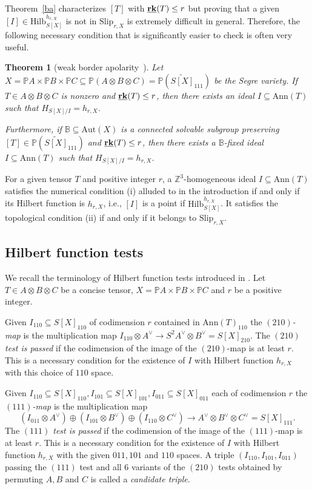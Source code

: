 \documentclass[12pt]{amsart}
\newtheorem{theorem}{Theorem}[section]
\theoremstyle{definition}
\theoremstyle{remark}
\theoremstyle{definition}
\newcommand{\brk}{{\underline{{\bf rk}}}}
\newcommand{\Slip}[2]{\mathrm{Slip}_{#1,#2}}
\newcommand{\PP}{\mathbb{P}}
\newcommand{\Ann}{\mathrm{Ann}}
\newcommand{\Hilb}{\mathrm{Hilb}}
\begin{document}
Theorem~\ref{ba} characterizes $[T]$ with $\brk(T) \le r$ but proving that a given $[I]\in \Hilb_{S[X]}^{h_{r,X}}$ is not in $\Slip{r}{X}$ is extremely difficult in general. Therefore, the following necessary condition that is significantly easier to check is often very useful.

\begin{theorem}[weak border apolarity~{\cite[Theorems~1.2]{BB19}}]\label{wba}
 Let $X = \PP A\times \PP B \times \PP C \subseteq \PP (A\otimes B\otimes C) = \PP (\widetilde{S[X]}_{111})$ be the Segre variety. If $T\in A\otimes B\otimes C$ is nonzero and $\brk(T) \le r$, then there exists an ideal $I\subseteq \Ann(T)$ such that $H_{S[X]/I}=h_{r,X}$. 

  Furthermore, if $\mathbb{B}\subseteq \mathrm{Aut}(X)$ is a connected solvable subgroup preserving $[T] \in \PP(\widetilde{S[X]}_{111})$ and $\brk(T) \le r$, then there exists a $\mathbb{B}$-fixed ideal $I\subseteq \Ann(T)$ such that $H_{S[X]/I}=h_{r,X}$.
\end{theorem}


For a given tensor $T$ and positive integer $r$, a $\mathbb{Z}^3$-homogeneous ideal $I\subseteq\Ann(T)$ satisfies the numerical condition (i) alluded to in the introduction if and only if its Hilbert function is $h_{r,X}$, i.e., $[I]$ is a point if $\Hilb_{S[X]}^{h_{r,X}}$. It satisfies the topological condition (ii) if and only if it belongs to $\mathrm{Slip}_{r,X}$.



\subsection{Hilbert function tests}\label{sub:HFtests}
We recall the terminology of Hilbert function tests introduced in \cite{chl19}. Let $T\in A\otimes B\otimes C$ be a concise tensor, $X=\PP A\times \PP B\times \PP C$ and $r$ be a positive integer.

Given $I_{110}\subseteq S[X]_{110}$ of codimension $r$ contained in $\Ann(T)_{110}$ the \emph{$(210)$-map} is the multiplication map
$I_{110}\otimes A^\vee \to S^2A^\vee\otimes B^\vee = S[X]_{210}$. The \emph{$(210)$ test is passed} if the codimension of the image of the $(210)$-map is at least $r$.
This is a necessary condition for the existence of $I$ with Hilbert function $h_{r,X}$ with this choice of $110$ space.

Given $I_{110}\subseteq S[X]_{110}, I_{101}\subseteq S[X]_{101}, I_{011}\subseteq S[X]_{011}$ each of codimension $r$ the \emph{$(111)$-map} is the multiplication map
\[
(I_{011}\otimes A^\vee) \oplus (I_{101}\otimes B^\vee) \oplus (I_{110}\otimes C^\vee) \to A^\vee\otimes B^\vee\otimes C^\vee = S[X]_{111}.
\]
The \emph{$(111)$ test is passed} if the codimension of the image of the $(111)$-map is at least $r$.
This is a necessary condition for the existence of $I$ with Hilbert function $h_{r,X}$ with the given $011, 101$ and $110$ spaces.
A triple $(I_{110}, I_{101}, I_{011})$ passing the $(111)$ test and all $6$ variants of the $(210)$ tests obtained by permuting $A,B$ and $C$ is called a \emph{candidate triple}.
\end{document}
